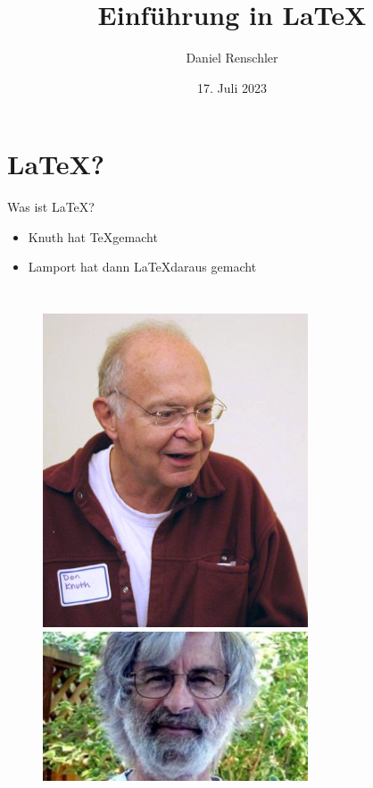 \documentclass{beamer}
\title{Einf\"uhrung in \LaTeX}
\author{Daniel Renschler}
\date{17. Juli 2023}
\begin{document}
\begin{frame}
    \titlepage 
\end{frame}


\begin{frame}
    \tableofcontents
\end{frame}


\section{\LaTeX?}
\begin{frame}{Was ist \LaTeX?}


    \begin{itemize}
        \item Knuth hat \TeX gemacht
        \item Lamport hat dann \LaTeX daraus gemacht
    \end{itemize}

    \begin{columns}
        
        \hfill
        \begin{figure}[htpb]
            \centering
            \includegraphics[width=0.7\textwidth]{./figs/tex-knuth.jpg}
            \includegraphics[width=0.7\textwidth]{./figs/latex-lamport.jpg}
        \end{figure}
    \end{columns}

\end{frame}
\end{document}
